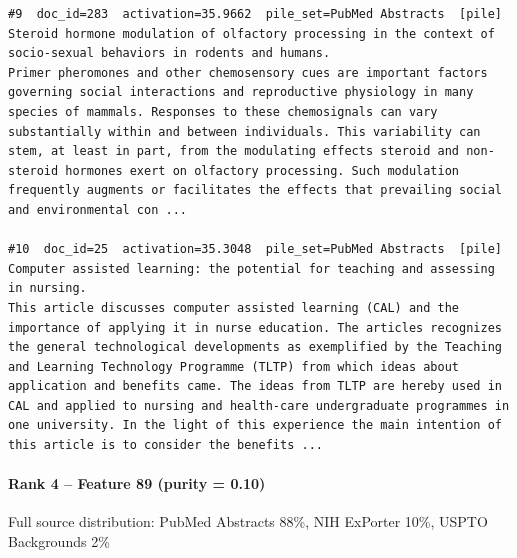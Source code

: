 \begin{verbatim}
#9  doc_id=283  activation=35.9662  pile_set=PubMed Abstracts  [pile]
Steroid hormone modulation of olfactory processing in the context of socio-sexual behaviors in rodents and humans.
Primer pheromones and other chemosensory cues are important factors governing social interactions and reproductive physiology in many species of mammals. Responses to these chemosignals can vary substantially within and between individuals. This variability can stem, at least in part, from the modulating effects steroid and non-steroid hormones exert on olfactory processing. Such modulation frequently augments or facilitates the effects that prevailing social and environmental con ...

#10  doc_id=25  activation=35.3048  pile_set=PubMed Abstracts  [pile]
Computer assisted learning: the potential for teaching and assessing in nursing.
This article discusses computer assisted learning (CAL) and the importance of applying it in nurse education. The articles recognizes the general technological developments as exemplified by the Teaching and Learning Technology Programme (TLTP) from which ideas about application and benefits came. The ideas from TLTP are hereby used in CAL and applied to nursing and health-care undergraduate programmes in one university. In the light of this experience the main intention of this article is to consider the benefits ...

\end{verbatim}

\paragraph*{Rank 4 -- Feature 89 (purity = 0.10)}

Full source distribution: PubMed Abstracts 88\%, NIH ExPorter 10\%, USPTO Backgrounds 2\%

